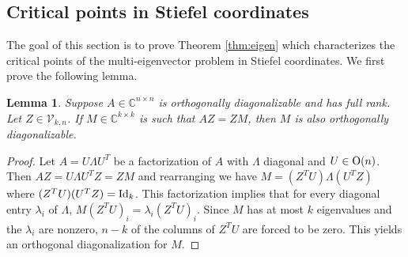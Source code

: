 \documentclass[12pt]{extarticle}
\newtheorem{lemma}[theorem]{Lemma}
\theoremstyle{definition}
\numberwithin{theorem}{section}
\newcommand{\CC}{\mathbb{C}}
\begin{document}
\subsection{Critical points in Stiefel coordinates}
The goal of this section is to prove Theorem \ref{thm:eigen} which characterizes the critical points of the multi-eigenvector problem in Stiefel coordinates. We first prove the following lemma.
\begin{lemma} \label{lem:diagonalization}
    Suppose $A\in \CC^{n \times n}$ is orthogonally diagonalizable and has full rank. 
    Let $Z \in \mathcal V_{k,n}$.
    If $M \in \CC^{k \times k}$ is such that $AZ = ZM$, then $M$ is also orthogonally diagonalizable. 
\end{lemma}
\begin{proof}
    Let $A = U\Lambda U^T$ be a factorization of $A$ with $\Lambda$ diagonal and $U \in {\rm O}(n)$. 
    Then $AZ = U\Lambda U^T Z = ZM$ and rearranging we have $M = (Z^T U) \Lambda (U^T Z)$ where $(Z^TU)(U^TZ) = {\rm Id}_k$. 
    This factorization implies that for every diagonal entry $\lambda_i$ of $\Lambda$, $M (Z^T U)_i = \lambda_i(Z^T U)_i$. 
    Since $M$ has at most $k$ eigenvalues and the $\lambda_i$ are nonzero, $n - k$ of the columns of $Z^T U$ are forced to be zero. 
    This yields an orthogonal diagonalization for $M$.
\end{proof}
\end{document}
